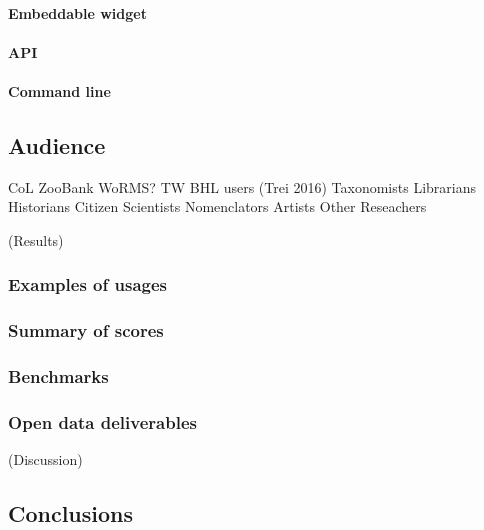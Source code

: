 \documentclass[
]{article}
\begin{document}
\hypertarget{embeddable-widget}{%
\paragraph{Embeddable widget}\label{embeddable-widget}}

\hypertarget{api}{%
\paragraph{API}\label{api}}

\hypertarget{command-line}{%
\paragraph{Command line}\label{command-line}}

\hypertarget{audience}{%
\subsection{Audience}\label{audience}}

CoL ZooBank WoRMS? TW BHL users (Trei 2016) Taxonomists Librarians
Historians Citizen Scientists Nomenclators Artists Other Reseachers

(Results)

\hypertarget{examples-of-usages}{%
\subsubsection{Examples of usages}\label{examples-of-usages}}

\hypertarget{summary-of-scores}{%
\subsubsection{Summary of scores}\label{summary-of-scores}}

\hypertarget{benchmarks}{%
\subsubsection{Benchmarks}\label{benchmarks}}

\hypertarget{open-data-deliverables}{%
\subsubsection{Open data deliverables}\label{open-data-deliverables}}

(Discussion)

\hypertarget{conclusions}{%
\subsection{Conclusions}\label{conclusions}}
\end{document}
